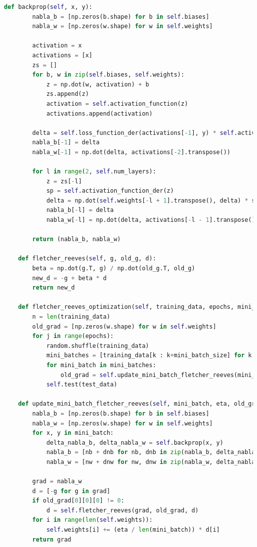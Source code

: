 \documentclass[a4paper, 14pt]{extarticle}
\begin{document}
\begin{lstlisting}[language={python},caption={Многослойный персептрон},label={lst:code1}]
    def backprop(self, x, y):
        nabla_b = [np.zeros(b.shape) for b in self.biases]
        nabla_w = [np.zeros(w.shape) for w in self.weights]

        activation = x
        activations = [x]
        zs = []
        for b, w in zip(self.biases, self.weights):
            z = np.dot(w, activation) + b
            zs.append(z)
            activation = self.activation_function(z)
            activations.append(activation)

        delta = self.loss_function_der(activations[-1], y) * self.activation_function_der(zs[-1])
        nabla_b[-1] = delta
        nabla_w[-1] = np.dot(delta, activations[-2].transpose())

        for l in range(2, self.num_layers):
            z = zs[-l]
            sp = self.activation_function_der(z)
            delta = np.dot(self.weights[-l + 1].transpose(), delta) * sp
            nabla_b[-l] = delta
            nabla_w[-l] = np.dot(delta, activations[-l - 1].transpose())

        return (nabla_b, nabla_w)

    def fletcher_reeves(self, g, old_g, d):
        beta = np.dot(g.T, g) / np.dot(old_g.T, old_g)
        new_d = -g + beta * d
        return new_d

    def fletcher_reeves_optimization(self, training_data, epochs, mini_batch_size, eta, test_data):
        n = len(training_data)
        old_grad = [np.zeros(w.shape) for w in self.weights]
        for j in range(epochs):
            random.shuffle(training_data)
            mini_batches = [training_data[k : k+mini_batch_size] for k in range(0, n, mini_batch_size)]
            for mini_batch in mini_batches:
                old_grad = self.update_mini_batch_fletcher_reeves(mini_batch, eta, old_grad)
            self.test(test_data)

    def update_mini_batch_fletcher_reeves(self, mini_batch, eta, old_grad):
        nabla_b = [np.zeros(b.shape) for b in self.biases]
        nabla_w = [np.zeros(w.shape) for w in self.weights]
        for x, y in mini_batch:
            delta_nabla_b, delta_nabla_w = self.backprop(x, y)
            nabla_b = [nb + dnb for nb, dnb in zip(nabla_b, delta_nabla_b)]
            nabla_w = [nw + dnw for nw, dnw in zip(nabla_w, delta_nabla_w)]

        grad = nabla_w
        d = [-g for g in grad]
        if old_grad[0][0][0] != 0:
            d = self.fletcher_reeves(grad, old_grad, d)
        for i in range(len(self.weights)):
            self.weights[i] += (eta / len(mini_batch)) * d[i]
        return grad


\end{lstlisting}
\end{document}
